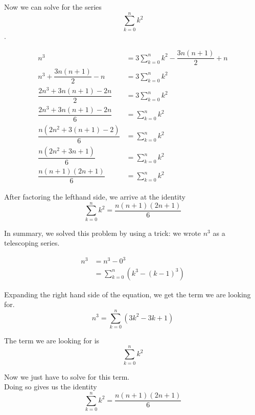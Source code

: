 \documentclass{article}
\begin{document}
Now we can solve for the series $$\sum_{k=0}^{n} k^2$$.

\begin{align*}
n^3 &= 3 \sum_{k=0}^{n} k^2 - \dfrac{3n(n+1)}{2} + n \\
n^3 + \dfrac{3n(n+1)}{2} - n &= 3 \sum_{k=0}^{n} k^2 \\
\dfrac{2n^3 + 3n(n+1) - 2n}{2} &= 3 \sum_{k=0}^{n} k^2 \\
\dfrac{2n^3 + 3n(n+1) - 2n}{6} &= \sum_{k=0}^{n} k^2 \\
\dfrac{n(2n^2 + 3(n+1) - 2)}{6} &= \sum_{k=0}^{n} k^2 \\
\dfrac{n(2n^2 + 3n + 1)}{6} &= \sum_{k=0}^{n} k^2 \\
\dfrac{n(n+1)(2n+1)}{6} &= \sum_{k=0}^{n} k^2
\end{align*}

After factoring the lefthand side, we arrive at the identity $$\sum_{k=0}^{n} k^2 = \dfrac{n(n+1)(2n+1)}{6} $$

In summary, we solved this problem by using a trick: we wrote $n^3$ as a telescoping series.

\begin{align*}
n^3 &= n^3 - 0^3 \\
&= \sum_{k=0}^{n} \left( k^3 - (k-1)^3 \right)
\end{align*}

Expanding the right hand side of the equation, we get the term we are looking for. $$ n^3 = \sum_{k=0}^{n} \left( 3k^2 - 3k + 1 \right)  $$

The term we are looking for is $$ \sum_{k=0}^{n} k^2 $$

Now we just have to solve for this term. \\

Doing so gives us the identity $$\sum_{k=0}^{n} k^2 = \dfrac{n(n+1)(2n+1)}{6} $$
\end{document}

